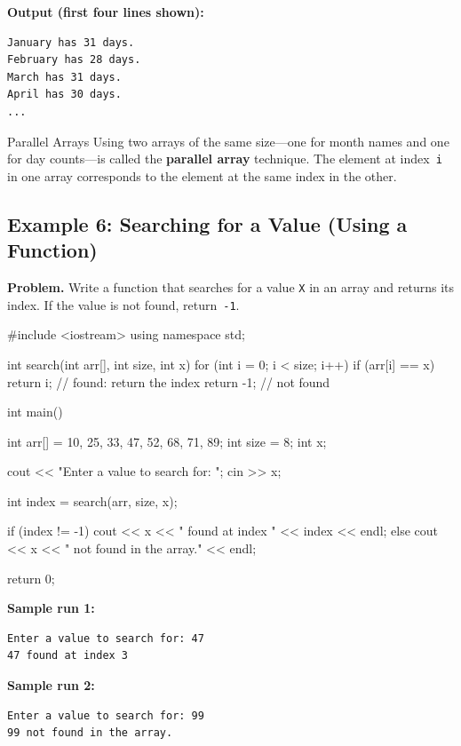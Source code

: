 \textbf{Output (first four lines shown):}
\begin{verbatim}
January has 31 days.
February has 28 days.
March has 31 days.
April has 30 days.
...
\end{verbatim}

\begin{conceptbox}{Parallel Arrays}
Using two arrays of the same size---one for month names and one for day
counts---is called the \textbf{parallel array} technique. The element at
index~\texttt{i} in one array corresponds to the element at the same
index in the other.
\end{conceptbox}

\subsection{Example 6: Searching for a Value (Using a Function)}

\textbf{Problem.} Write a function that searches for a value \texttt{X}
in an array and returns its index. If the value is not found,
return~\texttt{-1}.

\begin{cppcode}
#include <iostream>
using namespace std;

int search(int arr[], int size, int x) {
    for (int i = 0; i < size; i++) {
        if (arr[i] == x) {
            return i;   // found: return the index
        }
    }
    return -1;          // not found
}

int main() {
    int arr[] = {10, 25, 33, 47, 52, 68, 71, 89};
    int size = 8;
    int x;

    cout << "Enter a value to search for: ";
    cin >> x;

    int index = search(arr, size, x);

    if (index != -1) {
        cout << x << " found at index "
             << index << endl;
    } else {
        cout << x << " not found in the array."
             << endl;
    }

    return 0;
}
\end{cppcode}

\textbf{Sample run 1:}
\begin{verbatim}
Enter a value to search for: 47
47 found at index 3
\end{verbatim}

\textbf{Sample run 2:}
\begin{verbatim}
Enter a value to search for: 99
99 not found in the array.
\end{verbatim}

